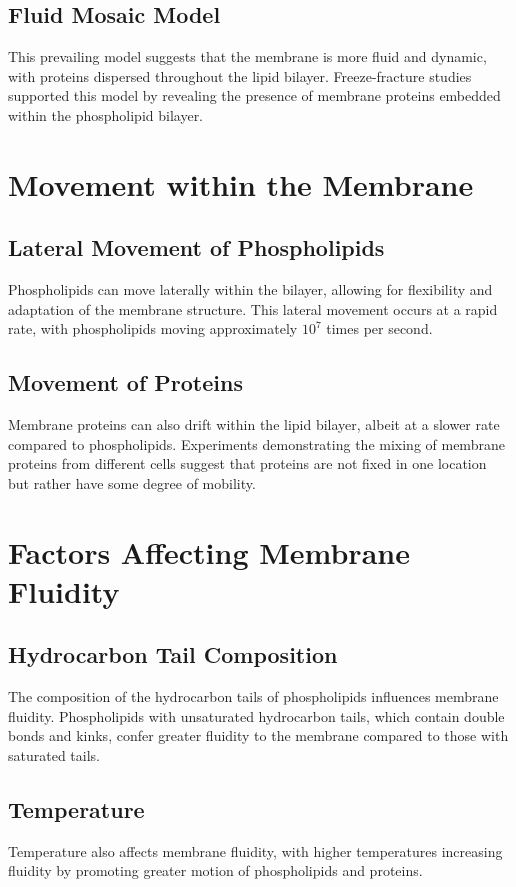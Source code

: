 \documentclass{article}
\begin{document}
\subsection{Fluid Mosaic Model}
This prevailing model suggests that the membrane is more fluid and dynamic, with proteins dispersed throughout the lipid bilayer. Freeze-fracture studies supported this model by revealing the presence of membrane proteins embedded within the phospholipid bilayer.

\section*{Movement within the Membrane}

\subsection{Lateral Movement of Phospholipids}
Phospholipids can move laterally within the bilayer, allowing for flexibility and adaptation of the membrane structure. This lateral movement occurs at a rapid rate, with phospholipids moving approximately $10^7$ times per second.

\subsection{Movement of Proteins}
Membrane proteins can also drift within the lipid bilayer, albeit at a slower rate compared to phospholipids. Experiments demonstrating the mixing of membrane proteins from different cells suggest that proteins are not fixed in one location but rather have some degree of mobility.

\section*{Factors Affecting Membrane Fluidity}

\subsection{Hydrocarbon Tail Composition}
The composition of the hydrocarbon tails of phospholipids influences membrane fluidity. Phospholipids with unsaturated hydrocarbon tails, which contain double bonds and kinks, confer greater fluidity to the membrane compared to those with saturated tails.

\subsection{Temperature}
Temperature also affects membrane fluidity, with higher temperatures increasing fluidity by promoting greater motion of phospholipids and proteins.
\end{document}
